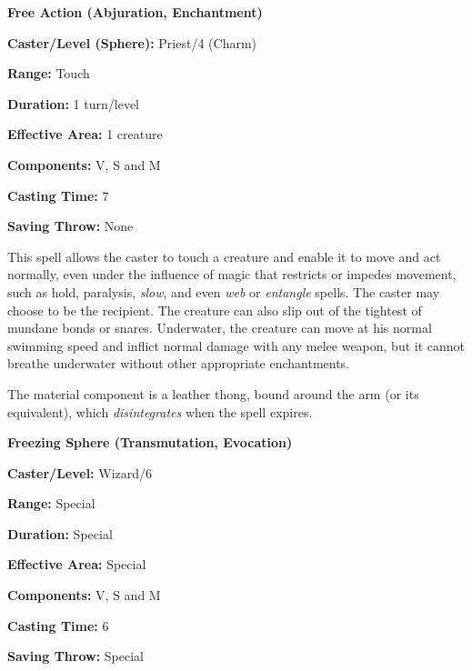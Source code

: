 \begin{multicols}{2}
\vspace{1em}

\noindent
\begin{minipage}{\columnwidth}

\noindent \textbf{Free Action (Abjuration, Enchantment)}

\noindent \textbf{Caster/Level (Sphere):} Priest/4 (Charm)

\noindent \textbf{Range:} Touch

\noindent \textbf{Duration:} 1 turn/level

\noindent \textbf{Effective Area:} 1 creature

\noindent \textbf{Components:} V, S and M

\noindent \textbf{Casting Time:} 7

\noindent \textbf{Saving Throw:} None

\end{minipage}

This spell allows the caster to touch a creature and enable it to move and act normally, even under the influence of magic that restricts or impedes movement, such as hold, paralysis, \textit{slow}, and even \textit{web} or \textit{entangle} spells.  The caster may choose to be the recipient. The creature can also slip out of the tightest of mundane bonds or snares.  Underwater, the creature can move at his normal swimming speed and inflict normal damage with any melee weapon, but it cannot breathe underwater without other appropriate enchantments.

The material component is a leather thong, bound around the arm (or its equivalent), which \textit{disintegrates} when the spell expires.

\vspace{1em}

\noindent
\begin{minipage}{\columnwidth}

\noindent \textbf{Freezing Sphere (Transmutation, Evocation)}

\noindent \textbf{Caster/Level:} Wizard/6

\noindent \textbf{Range:} Special

\noindent \textbf{Duration:} Special

\noindent \textbf{Effective Area:} Special

\noindent \textbf{Components:} V, S and M

\noindent \textbf{Casting Time:} 6

\noindent \textbf{Saving Throw:} Special


\end{minipage}
\end{multicols}
